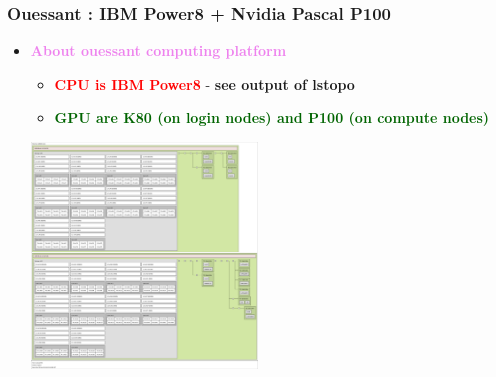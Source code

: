 \begin{frame}
  \frametitle{Ouessant : IBM Power8 + Nvidia Pascal P100}
  
  \begin{itemize}
  \item {\bf \textcolor{violet}{\large About ouessant computing platform}}
    \begin{itemize}
    \item \textcolor{red}{\bf CPU is IBM Power8} - {\bf see output of lstopo}
    \item \textcolor{darkgreen}{\bf GPU are K80 (on login nodes) and P100 (on compute nodes)}
    \end{itemize}
    \includegraphics[width=6cm]{images/ouessant_lstopo}
  \end{itemize}

\end{frame}

